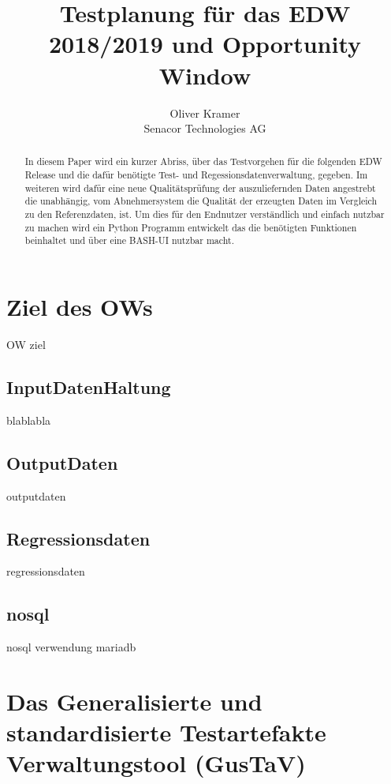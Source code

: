 \documentclass{jfp1}
\title[Paper zur Testplanung 2018/2019 und Opportunity Window ]
      {Testplanung für das EDW 2018/2019 und Opportunity Window}
\author[O. Kramer]
        {Oliver Kramer\\
         Senacor Technologies AG\\
         \email{oliver.kramer@senacor.de}}
\begin{document}
\label{firstpage}

\maketitle

\begin{abstract}
In diesem Paper wird ein kurzer Abriss, über das Testvorgehen für die folgenden EDW Release und die dafür benötigte Test- und Regessionsdatenverwaltung, gegeben. Im weiteren wird dafür eine neue Qualitätsprüfung der auszuliefernden Daten angestrebt die unabhängig, vom Abnehmersystem die Qualität der erzeugten Daten im Vergleich zu den Referenzdaten, ist. Um dies für den Endnutzer verständlich und einfach nutzbar zu machen wird ein Python Programm entwickelt das die benötigten Funktionen beinhaltet und über eine BASH-UI nutzbar macht.
\end{abstract}

\tableofcontents

\section{Ziel des OWs}
OW ziel

\subsection{InputDatenHaltung}
blablabla

\subsection{OutputDaten}
outputdaten

\subsection{Regressionsdaten}

regressionsdaten

\subsection{nosql}

nosql verwendung mariadb



\section{Das Generalisierte und standardisierte Testartefakte Verwaltungstool (GusTaV)}
\label{usingjfpclass}
\end{document}

